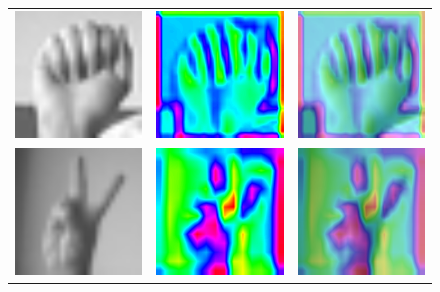 \documentclass[a4paper]{article}
\begin{document}
\begin{figure}[t]
     \centering
     \begin{tabular}{ccc}
          \includegraphics[width=.25\linewidth]{graphics/gradcam/layer1/0_original}&\includegraphics[width=.25\linewidth]{graphics/gradcam/layer1/0_map}&\includegraphics[width=.25\linewidth]{graphics/gradcam/layer1/0_overlaid} \\
          \includegraphics[width=.25\linewidth]{graphics/gradcam/layer3/0_original}&\includegraphics[width=.25\linewidth]{graphics/gradcam/layer3/0_map}&\includegraphics[width=.25\linewidth]{graphics/gradcam/layer3/0_overlaid} \\

\end{tabular}
\end{figure}
\end{document}
